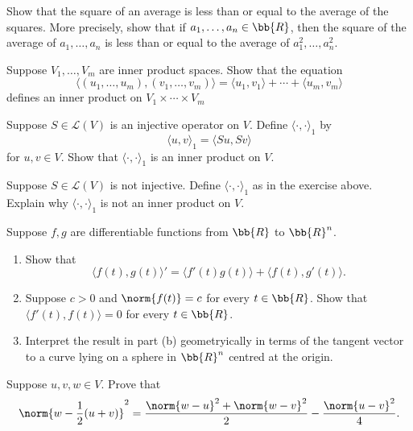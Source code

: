 \documentclass[12pt,letterpaper]{hmcpset}
\begin{document}
\begin{problem}[22]
	Show that the square of an average is less than or equal to the average of the squares. More precisely, show that if $a_1, \ldots, a_n \in \bb{R}$, then the square of the average of $a_1, \ldots, a_n$ is less than or equal to the average of $a_1^2, \ldots, a_n^2$.
\end{problem}

\begin{problem}[23]
	Suppose $V_1, \ldots, V_m$ are inner product spaces. Show that the equation
	\[
		\langle (u_1, \ldots, u_m), (v_1, \ldots, v_m) \rangle = \langle u_1, v_1 \rangle + \cdots + \langle u_m, v_m \rangle
	\]
	defines an inner product on $V_1 \times \cdots \times V_m$
\end{problem}

\begin{problem}[24]
	Suppose $S \in \mathcal{L}(V)$ is an injective operator on $V$. Define $\langle \cdot, \cdot \rangle_1$ by
	\[
		\langle u, v \rangle_1 = \langle Su, Sv \rangle
	\]
	for $u, v \in V$. Show that $\langle \cdot, \cdot \rangle_1$ is an inner product on $V$.
\end{problem}

\begin{problem}[25]
	Suppose $S \in \mathcal{L}(V)$ is not injective. Define $\langle \cdot, \cdot \rangle_1$ as in the exercise above. Explain why $\langle \cdot, \cdot \rangle_1$ is not an inner product on $V$.
\end{problem}

\begin{problem}[26]
	Suppose $f, g$ are differentiable functions from $\bb{R}$ to $\bb{R}^n$.
	\begin{enumerate}
		\item Show that
			\[
				\langle f(t), g(t) \rangle' = \langle f'(t) g(t) \rangle + \langle f(t), g'(t) \rangle.
			\]
		\item Suppose $c > 0$ and $\norm{f(t)} = c$ for every $t \in \bb{R}$. Show that $\langle f'(t), f(t) \rangle = 0$ for every $t \in \bb{R}$.
		\item Interpret the result in part (b) geometryically in terms of the tangent vector to a curve lying on a sphere in $\bb{R}^n$ centred at the origin.
	\end{enumerate}
\end{problem}

\begin{problem}[27]
	Suppose $u, v, w \in V$. Prove that
	\[
		\norm{w - \frac{1}{2}(u + v)}^2 = \frac{\norm{w - u}^2 + \norm{w - v}^2}{2} - \frac{\norm{u - v}^2}{4}.
	\]
\end{problem}
\end{document}
